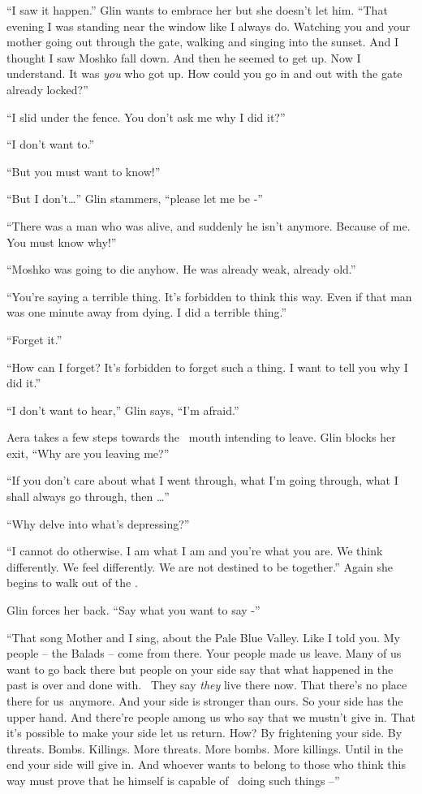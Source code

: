 \documentclass[twoside,11pt]{book}
\begin{document}
``I saw it happen.'' Glin wants to embrace her but she doesn't let him. ``That
evening I was standing near the window like I always do. Watching you and your mother going out through the gate,
walking and singing into the sunset. And I thought I saw Moshko fall down. And then he seemed to get up. Now I
understand. It was \textit{you} who got up. How could you go in and out with the gate already locked?''

``I slid under the fence. You don't ask me why I did it?''

``I don't want to.''

``But you must want to know!''

``But I don't{\dots}'' Glin stammers, ``please let me be -''

``There was a man who was alive, and suddenly he isn't anymore. Because of me. You must know
why!''

``Moshko was going to die anyhow. He was already weak, already old.''

``You're saying a terrible thing. It's forbidden to think this way. Even if that man was one minute away
from dying. I did a terrible thing.''

``Forget it.''

``How can I forget? It's forbidden to forget such a thing. I want to tell you why I did it.''

``I don't want to hear,'' Glin says, ``I'm afraid.''

Aera takes a few steps towards the \ mouth{ }intending to leave. Glin blocks her exit, ``Why
are you leaving me?''

``If you don't care about what I went through, what I'm going through, what I shall always go through, then
{\dots}''

``Why delve into what's depressing?''

``I cannot do otherwise. I am what I am and you're what you are. We think differently. We feel differently.
We are not destined to be together.'' Again she begins to walk out of the .

Glin forces her back. ``Say what you want to say -''

``That song Mother and I sing, about the Pale Blue Valley. Like I told you. My people -- the Balads -- come
from there. Your people made us leave. Many of us want to go back there but people on your side say that what happened
in the past is over and done with. ~They say \textit{they }live there now. That there's no place there for us~anymore.
And your side is stronger than ours. So your side has the upper hand. And there're people among us who say that we
mustn't give in. That it's possible to make your side let us return. How? By frightening your side. By threats. Bombs.
Killings. More threats. More bombs. More killings. Until in the end your side will give in. And whoever wants to belong
to those who think this way must prove that he himself is capable of~ doing such things --''
\end{document}
